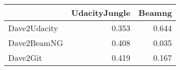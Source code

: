 \begin{tabular}{lrr}
\toprule
{} &  UdacityJungle &  Beamng \\
\midrule
Dave2Udacity &          0.353 &   0.644 \\
Dave2BeamNG  &          0.408 &   0.035 \\
Dave2Git     &          0.419 &   0.167 \\
\bottomrule
\end{tabular}
